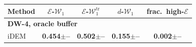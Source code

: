 \begin{tabular}{lcccc}
\toprule
Method & $\mathcal{E}$-$\mathcal{W}_1$ & $\mathcal{E}$-$\mathcal{W}_1^{\mathrm{tr}}$ & $d$-$\mathcal{W}_1$ & frac.\ high-$\mathcal{E}$ \\
\midrule
\multicolumn{5}{l}{\textbf{DW-4, oracle buffer}}\\
iDEM & \textbf{0.454{\scriptsize$\pm$--}} & \textbf{0.502{\scriptsize$\pm$--}} & \textbf{0.155{\scriptsize$\pm$--}} & \textbf{0.002{\scriptsize$\pm$--}} \\  %
\bottomrule
\end{tabular}
